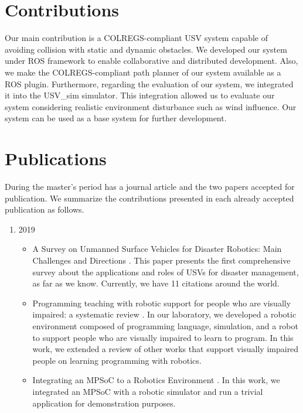     
    \section{Contributions}
    
    
     Our main contribution is a \ac{COLREGS}-compliant \ac{USV} system capable of avoiding collision with static and dynamic obstacles. We developed our system under \ac{ROS} framework to enable collaborative and distributed development. Also, we make the COLREGS-compliant path planner of our system available as a \ac{ROS} plugin. Furthermore, regarding the evaluation of our system, we integrated it into the USV\_sim simulator. This integration allowed us to evaluate our system considering realistic environment disturbance such as wind influence. Our system can be used as a base system for further development.

    \section{Publications}
    
    During the master's period has a journal article and the two papers accepted for publication. We summarize the contributions presented in each already accepted publication as follows.
    
    \begin{enumerate}
        \item 2019
            \begin{itemize}
                \item A Survey on Unmanned Surface Vehicles for Disaster Robotics: Main Challenges and Directions \cite{Jorge2019Survey}. This paper presents the first comprehensive survey about the applications and roles of \acp{USV} for disaster management, as far as we know. Currently, we have 11 citations around the world.
                \item Programming teaching with robotic support for people who are visually impaired: a systematic review \cite{Damasio2019Programming}. In our laboratory, we developed a robotic environment composed of programming language, simulation, and a robot to support people who are visually impaired to learn to program. In this work, we extended a review of other works that support visually impaired people on learning programming with robotics.
                \item Integrating an MPSoC to a Robotics Environment \cite{Domingues2019Integrating}. In this work, we integrated an MPSoC with a robotic simulator and run a trivial application for demonstration purposes.
            \end{itemize}
    \end{enumerate}
    
